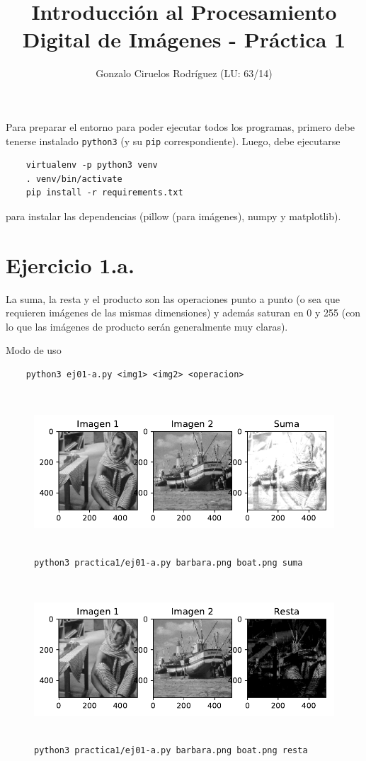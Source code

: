 \documentclass[11pt, spanish]{article}
\title{Introducción al Procesamiento Digital de Imágenes - Práctica 1}
\date{}
\author{Gonzalo Ciruelos Rodríguez (LU: 63/14)}
\begin{document}
\maketitle

Para preparar el entorno para poder ejecutar todos los programas,
primero debe tenerse instalado \texttt{python3} (y su \texttt{pip} correspondiente).
Luego, debe ejecutarse 
\begin{verbatim}
    virtualenv -p python3 venv 
    . venv/bin/activate
    pip install -r requirements.txt 
\end{verbatim}

\noindent para instalar las dependencias (pillow (para imágenes), numpy y matplotlib).



\section{Ejercicio 1.a.}

La suma, la resta y el producto son las operaciones punto a punto
(o sea que requieren imágenes de las mismas dimensiones) y además saturan en 0 y 255
(con lo que las imágenes de producto serán generalmente muy claras).

Modo de uso
\begin{verbatim}
    python3 ej01-a.py <img1> <img2> <operacion>
\end{verbatim}


\begin{figure}[H]
\centering
  \includegraphics[height=6cm]{informe-imgs/ej01-a-suma.pdf}
  \caption{\texttt{python3 practica1/ej01-a.py barbara.png boat.png suma}}
\end{figure}

\begin{figure}[H]
\centering
  \includegraphics[height=6cm]{informe-imgs/ej01-a-resta.pdf}
  \caption{\texttt{python3 practica1/ej01-a.py barbara.png boat.png resta}}
\end{figure}
\end{document}
